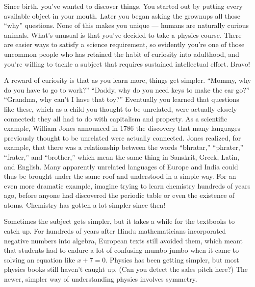 \label{ch:symmetry}

Since birth, you've wanted to discover things. You started out by putting every available object in your
mouth. Later you began asking the grownups all those ``why'' questions. None of this makes you unique ---
humans are naturally curious animals. What's unusual is that you've decided
to take a physics course. There are easier ways to satisfy a science requirement, so evidently you're
one of those uncommon people who has retained the habit of curiosity into adulthood, and
you're willing to tackle a subject that requires sustained intellectual effort. Bravo!

A reward of curiosity is that as you learn more, things get simpler. ``Mommy, why do you have to go
to work?'' ``Daddy, why do you need keys to make the car go?'' ``Grandma, why can't I have that toy?''
Eventually you learned that questions like these, which as a child you thought to be unrelated,
were actually closely connected: they all had to do with capitalism and property. 
As a scientific example, William Jones announced in 1786
the discovery that many languages previously thought
to be unrelated were actually connected. Jones realized, for example, that there was a relationship
between the words
``bhratar,'' ``phrater,'' ``frater,'' and ``brother,'' which mean the same thing
in Sanskrit, Greek, Latin, and English. Many apparently unrelated languages of Europe and
India could thus be brought under the same roof and understood in a simple way.
For an even more dramatic example, imagine trying to learn chemistry hundreds of years
ago, before anyone had discovered the periodic table or even the existence of atoms.
Chemistry has gotten a lot simpler since then!

Sometimes the subject gets simpler, but it takes a while for the textbooks to catch up.
For hundreds of years after Hindu mathematicians incorporated negative numbers into
algebra, European texts still avoided them, which meant that students had to endure
a lot of confusing mumbo jumbo when it came to solving an equation like $x+7=0$.
Physics has been getting simpler, but most physics books still haven't caught up.
(Can you detect the sales pitch here?) The newer, simpler way of understanding physics
involves symmetry.

\pagebreak[4]

